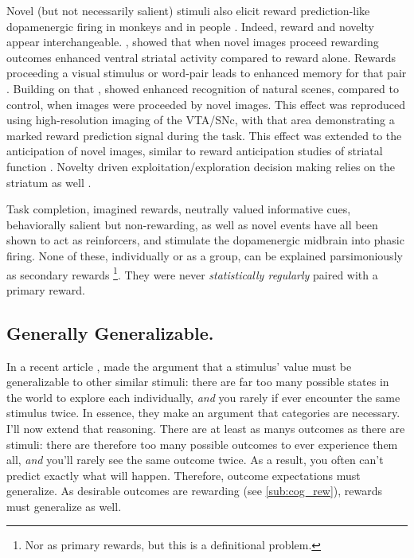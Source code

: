 \documentclass[doc,12pt]{apa}        %
\begin{document}
Novel (but not necessarily salient) stimuli also elicit reward prediction-like dopamenergic firing in monkeys \cite{Blatter:2006p6372} and in people \cite{Bunzeck:2006p5319}. Indeed, reward and novelty appear interchangeable.  , showed that when novel images proceed rewarding outcomes enhanced ventral striatal activity compared to reward alone.  Rewards proceeding a visual stimulus or word-pair leads to enhanced memory for that pair \cite{Lisman:2005p5455}.  Building on that , showed enhanced recognition of natural scenes, compared to control, when images were proceeded by novel images.  This effect was reproduced using high-resolution imaging of the VTA/SNc, with that area demonstrating a marked reward prediction signal during the task.  This effect was extended to the anticipation of novel images, similar to reward anticipation studies of striatal function \cite{Knutson:2001p5234}.  Novelty driven exploitation/exploration decision making relies on the striatum as well \cite{Wittmann:2008p541}.

Task completion, imagined rewards, neutrally valued informative cues, behaviorally salient but non-rewarding, as well as novel events have all been shown to act as reinforcers, and stimulate the dopamenergic midbrain into phasic firing.  None of these, individually or as a group, can be explained parsimoniously as secondary rewards
\footnote{
    Nor as primary rewards, but this is a definitional problem.
}.  They were never \emph{statistically regularly} paired with a primary reward.


\subsection{Generally Generalizable.}
\label{sub:gen}
In a recent article , made the argument that a stimulus' value must be generalizable to other similar stimuli: there are far too many possible states in the world to explore each individually, \emph{and} you rarely if ever encounter the same stimulus twice.  In essence, they make an argument that categories are necessary.  I'll now extend that reasoning.  There are at least as manys outcomes as there are stimuli: there are therefore too many possible outcomes to ever experience them all, \emph{and} you'll rarely see the same outcome twice.  As a result, you often can't predict exactly what will happen. Therefore, outcome expectations must generalize.  As desirable outcomes are rewarding (see \ref{sub:cog_rew}), rewards must generalize as well.
\end{document}
